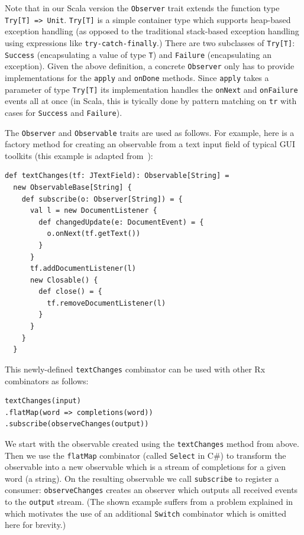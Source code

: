\documentclass[runningheads]{llncs}
\begin{document}
\begin{sloppypar}
Note that in our Scala version the \verb|Observer| trait extends the function
type \verb|Try[T] => Unit|. \verb|Try[T]| is a simple container type which
supports heap-based exception handling (as opposed to the traditional stack-based
exception handling using expressions like \verb|try-catch-finally|.)
There are two subclasses of \verb|Try[T]|: \verb|Success| (encapsulating a
value of type \verb|T|) and \verb|Failure| (encapsulating an exception). Given
the above definition, a concrete \verb|Observer| only has to provide
implementations for the \verb|apply| and \verb|onDone| methods. Since
\verb|apply| takes a parameter of type \verb|Try[T]| its implementation
handles the \verb|onNext| and \verb|onFailure| events all at once (in Scala,
this is tyically done by pattern matching on \verb|tr| with cases for
\verb|Success| and \verb|Failure|).

The \verb|Observer| and \verb|Observable| traits are used as follows. For
example, here is a factory method for creating an observable from a text input
field of typical GUI toolkits (this example is adapted from~\cite{RxCACM}):

\lstset{numbers=none,xleftmargin=0em}
\begin{lstlisting}
def textChanges(tf: JTextField): Observable[String] =
  new ObservableBase[String] {
    def subscribe(o: Observer[String]) = {
      val l = new DocumentListener {
        def changedUpdate(e: DocumentEvent) = {
          o.onNext(tf.getText())
        }
      }
      tf.addDocumentListener(l)
      new Closable() {
        def close() = {
          tf.removeDocumentListener(l)
        }
      }
    }
  }
\end{lstlisting}

This newly-defined \verb|textChanges| combinator can be used with other Rx
combinators as follows:

\begin{lstlisting}
textChanges(input)
.flatMap(word => completions(word))
.subscribe(observeChanges(output))
\end{lstlisting}

We start with the observable created using the \verb|textChanges| method from
above. Then we use the \verb|flatMap| combinator (called \verb|Select| in C\#)
to transform the observable into a new observable which is a stream of
completions for a given word (a string). On the resulting observable we call
\verb|subscribe| to register a consumer: \verb|observeChanges| creates an
observer which outputs all received events to the \verb|output| stream. (The
shown example suffers from a problem explained in~\cite{RxCACM} which
motivates the use of an additional \verb|Switch| combinator which is omitted
here for brevity.)


\end{sloppypar}
\end{document}
